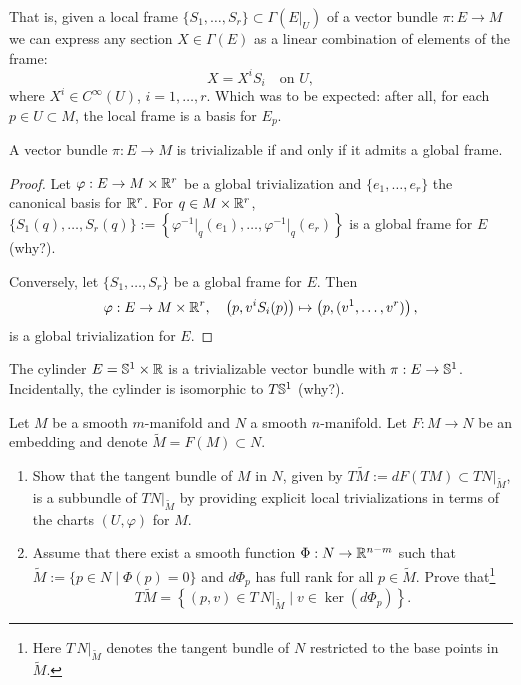 That is, given a local frame $\{S_1, \ldots, S_r\}\subset\Gamma(E|_U)$ of a vector bundle $\pi: E \to M$ we can express any section $X\in\Gamma(E)$ as a linear combination of elements of the frame:
\begin{equation}
  X = X^i S_i \quad\mbox{on }U,
\end{equation}
where $X^i\in C^\infty(U)$, $i=1,\ldots,r$.
Which was to be expected: after all, for each $p\in U\subset M$, the local frame is a basis for $E_p$.

\begin{proposition}\label{prop:trivializable}
  A vector bundle $\pi: E\to M$ is trivializable if and only if it admits a global frame.
\end{proposition}
\begin{proof}
  Let $\varphi: E \to M\times\mathbb{R}^r$ be a global trivialization and $\{e_1, \ldots, e_r\}$ the canonical basis for $\mathbb{R}^r$.
  For $q\in M\times\mathbb{R}^r$, $\{S_1(q), \ldots, S_r(q)\} := \left\{\varphi^{-1}\big|_q(e_1), \ldots, \varphi^{-1}\big|_q(e_r) \right\}$ is a global frame for $E$ (why?).

  Conversely, let $\{S_1, \ldots, S_r\}$ be a global frame for $E$. Then
  \begin{equation}
    \varphi: E \to M\times\mathbb{R}^r, \quad
    \left(p, v^i S_i(p)\right) \mapsto \left(p, (v^1, \ldots, v^r)\right),
  \end{equation}
  is a global trivialization for $E$.
\end{proof}

\begin{example}
  The cylinder $E = \mathbb{S}^1\times\mathbb{R}$ is a trivializable vector bundle with $\pi:E\to \mathbb{S}^1$.
  Incidentally, the cylinder is isomorphic to $T\mathbb{S}^1$ (why?).
\end{example}

\begin{exercise}
  Let $M$ be a smooth $m$-manifold and $N$ a smooth $n$-manifold.
  Let $F:M\to N$ be an embedding and denote $\widetilde M = F(M)\subset N$.
  \begin{enumerate}
    \item Show that the tangent bundle of $M$ in $N$, given by $T\widetilde M := dF(TM) \subset TN\big|_{\widetilde M}$, is a subbundle of $TN\big|_{\widetilde M}$ by providing explicit local trivializations in terms of the charts $(U, \varphi)$ for $M$.
    \item Assume that there exist a smooth function $\Phi:N\to\mathbb{R}^{n-m}$ such that $\widetilde M := \{p\in N \mid \Phi(p) = 0\}$ and $d\Phi_p$ has full rank for all $p\in\widetilde M$. Prove that\footnote{Here $T\,N|_{\widetilde{M}}$ denotes the tangent bundle of $N$ restricted to the base points in $\widetilde{M}$.}
          \begin{equation}
            T\widetilde{M} = \left\{(p,v)\in T\,N|_{\widetilde{M}} \mid v\in\ker(d\Phi_p)\right\}.
          \end{equation}
  \end{enumerate}
\end{exercise}

